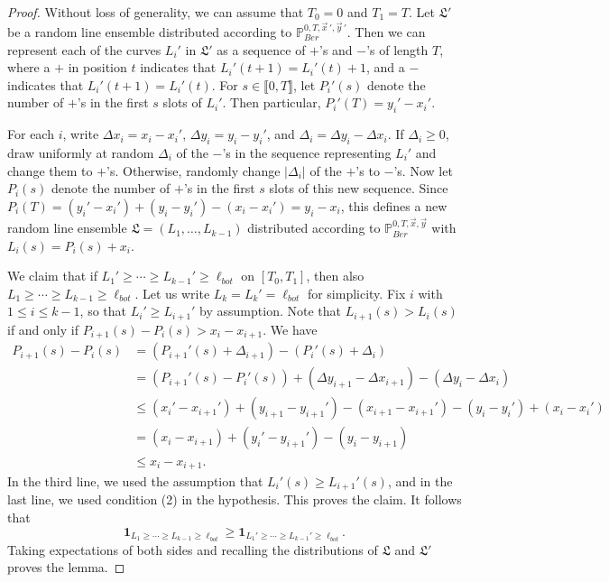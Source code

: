 	\begin{proof}
		Without loss of generality, we can assume that $T_0 = 0$ and $T_1 = T$. Let $\mathfrak{L}'$ be a random line ensemble distributed according to $\mathbb{P}^{0, T, \vec{x}\,', \vec{y}\,'}_{Ber}$. Then we can represent each of the curves $L_i'$ in $\mathfrak{L}'$ as a sequence of $+$'s and $-$'s of length $T$, where a $+$ in position $t$ indicates that $L_i'(t+1) = L_i'(t) + 1$, and a $-$ indicates that $L_i'(t+1) = L_i'(t)$. For $s\in\llbracket 0, T\rrbracket$, let $P_i'(s)$ denote the number of $+$'s in the first $s$ slots of $L_i'$. Then particular, $P_i'(T) = y_i' - x_i'$.
		
		For each $i$, write $\Delta x_i = x_i - x_i'$, $\Delta y_i = y_i - y_i'$, and $\Delta_i = \Delta y_i - \Delta x_i$. If $\Delta_i \geq 0$, draw uniformly at random $\Delta_i$ of the $-$'s in the sequence representing $L_i'$ and change them to $+$'s. Otherwise, randomly change $\lvert{\Delta_i}\rvert$ of the $+$'s to $-$'s. Now let $P_i(s)$ denote the number of $+$'s in the first $s$ slots of this new sequence. Since $P_i(T) = (y_i' - x_i') + (y_i - y_i') - (x_i - x_i') = y_i - x_i$, this defines a new random line ensemble $\mathfrak{L} = (L_1,\dots,L_{k-1})$ distributed according to $\mathbb{P}^{0,T,\vec{x},\vec{y}}_{Ber}$ with $L_i(s)=P_i(s)+x_i$.
		
		We claim that if $L_1' \geq \cdots \geq L_{k-1}' \geq \ell_{bot}$ on $[T_0, T_1]$, then also $L_1 \geq \cdots \geq L_{k-1} \geq \ell_{bot}$. Let us write $L_k = L_k' = \ell_{bot}$ for simplicity. Fix $i$ with $1\leq i\leq k - 1$, so that $L_i' \geq L_{i+1}'$ by assumption. Note that $L_{i+1}(s) > L_i(s)$ if and only if $P_{i+1}(s) - P_i(s) > x_i - x_{i+1}$. We have
		\begin{align*}
		P_{i+1}(s) - P_i(s) &= (P_{i+1}'(s) + \Delta_{i+1}) - (P_i'(s) + \Delta_i)\\
		&= (P_{i+1}'(s) - P_i'(s)) + (\Delta y_{i+1} - \Delta x_{i+1}) - (\Delta y_i - \Delta x_i)\\
		&\leq (x_i' - x_{i+1}') + (y_{i+1} - y_{i+1}') - (x_{i+1} - x_{i+1}') - (y_i - y_i') + (x_i - x_i')\\
		&= (x_i - x_{i+1}) + (y_i' - y_{i+1}') - (y_i - y_{i+1})\\
		&\leq x_i - x_{i+1}.
		\end{align*}
		In the third line, we used the assumption that $L_i'(s) \geq L_{i+1}'(s)$, and in the last line, we used condition (2) in the hypothesis. This proves the claim. It follows that
		\[
		\mathbf{1}_{L_1 \geq \cdots \geq L_{k-1} \geq \ell_{bot}} \geq \mathbf{1}_{L_1' \geq \cdots \geq L_{k-1}' \geq \ell_{bot}}.
		\]
		Taking expectations of both sides and recalling the distributions of $\mathfrak{L}$ and $\mathfrak{L}'$ proves the lemma.
		
		\end{proof}
		
